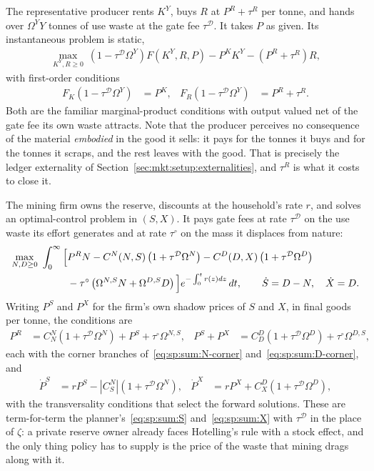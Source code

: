  The representative producer rents $K^Y$, buys $R$ at $P^R+\tau^R$ per tonne,
and hands over $\Omega^YY$ tonnes of use waste at the gate fee $\tau^{\mathcal D}$. It takes $P$ as
given. Its instantaneous problem is static,
\begin{align}
\max_{K^Y,R\ge0}\ \left(1-\tau^{\mathcal D}\Omega^Y\right)F\left(K^Y,R,P\right)-P^KK^Y-\left(P^R+\tau^R\right)R,
\label{eq:mkt:final-problem}
\end{align}
with first-order conditions
\begin{align}
F_K\left(1-\tau^{\mathcal D}\Omega^Y\right) &= P^K,
&
F_R\left(1-\tau^{\mathcal D}\Omega^Y\right) &= P^R+\tau^R .
\label{eq:mkt:final-foc}
\end{align}
Both are the familiar marginal-product conditions with output valued net of the gate fee its own waste
attracts. Note that the producer perceives no consequence of the material \emph{embodied} in the good
it sells: it pays for the tonnes it buys and for the tonnes it scraps, and the rest leaves with the
good. That is precisely the ledger externality of Section~\ref{sec:mkt:setup:externalities}, and
$\tau^R$ is what it costs to close it.

 The mining firm owns the reserve, discounts at the household's rate $r$, and
solves an optimal-control problem in $\left(S,X\right)$. It pays gate fees at rate
$\tau^{\mathcal D}$ on the use waste its effort generates and at rate $\tau^{\circ}$ on the mass it
displaces from nature:
\begin{align}
\max_{N,D\ge0}\ \int_0^\infty
\Big[&P^RN-C^N\!\left(N,S\right)\left(1+\tau^{\mathcal D}\Omega^N\right)
-C^D\!\left(D,X\right)\left(1+\tau^{\mathcal D}\Omega^D\right)
\notag\\
&-\tau^{\circ}\left(\Omega^{N,S}N+\Omega^{D,S}D\right)\Big]
e^{-\int_0^{t}r\left(z\right)dz}\,dt,
\qquad
\dot S=D-N,
\quad
\dot X=D .
\label{eq:mkt:mining-problem}
\end{align}
Writing $P^S$ and $P^X$ for the firm's own shadow prices of $S$ and $X$, in final goods per tonne, the
conditions are
\begin{align}
P^R &= C^N_N\left(1+\tau^{\mathcal D}\Omega^N\right)+P^S+\tau^{\circ}\Omega^{N,S},
&
P^S+P^X &= C^D_D\left(1+\tau^{\mathcal D}\Omega^D\right)+\tau^{\circ}\Omega^{D,S},
\label{eq:mkt:mining-foc}
\end{align}
each with the corner branches of~\eqref{eq:sp:sum:N-corner} and~\eqref{eq:sp:sum:D-corner}, and
\begin{align}
\dot P^S &= rP^S-\left|C^N_S\right|\left(1+\tau^{\mathcal D}\Omega^N\right),
&
\dot P^X &= rP^X+C^D_X\left(1+\tau^{\mathcal D}\Omega^D\right),
\label{eq:mkt:mining-costates}
\end{align}
with the transversality conditions that select the forward solutions. These are
term-for-term the planner's~\eqref{eq:sp:sum:S} and~\eqref{eq:sp:sum:X} with
$\tau^{\mathcal D}$ in the place of $\zeta$: a private reserve owner already faces Hotelling's rule
with a stock effect, and the only thing policy has to supply is the price of the waste that mining
drags along with it.

